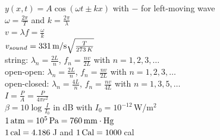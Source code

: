 \documentclass[letterpaper,addpoints,answers]{exam}
\begin{document}
\begin{multicols}{2}
 $y(x,t) = A \cos (\omega t \pm k x)$ with $-$ for left-moving wave \\
 $\omega = \frac{2 \pi}{T}$ and $k = \frac{2 \pi}{\lambda}$ \\
 $v = \lambda f = \frac{\omega}{k}$ \\
 $v_{sound} = 331\,\hbox{m/s} \sqrt{\frac{T}{273\,K}}$ \\
 string: $\lambda_n = \frac{2 L}{n}$, $f_n = \frac{n v}{2 L}$ with $n = 1,2,3,\ldots$ \\
 open-open: $\lambda_n = \frac{2 L}{n}$, $f_n = \frac{n v}{2 L}$ with $n = 1,2,3,\ldots$ \\
 open-closed: $\lambda_n = \frac{4 L}{n}$, $f_n = \frac{n v}{4 L}$ with $n = 1,3,5,\ldots$ \\
 $I = \frac{P}{A} = \frac{P}{4 \pi r^2}$ \\
 $\beta = 10 \log \frac{I}{I_0}$ in dB with $I_0 = 10^{-12}$\,W/m$^2$ \\
 $1\,\hbox{atm} = 10^5\,\hbox{Pa} = 760\,\hbox{mm}\cdot\hbox{Hg}$ \\
 $1\,\hbox{cal} = 4.186$\,J and $1\,\hbox{Cal} = 1000$\,cal \\ 
 \end{multicols}
\end{document}
